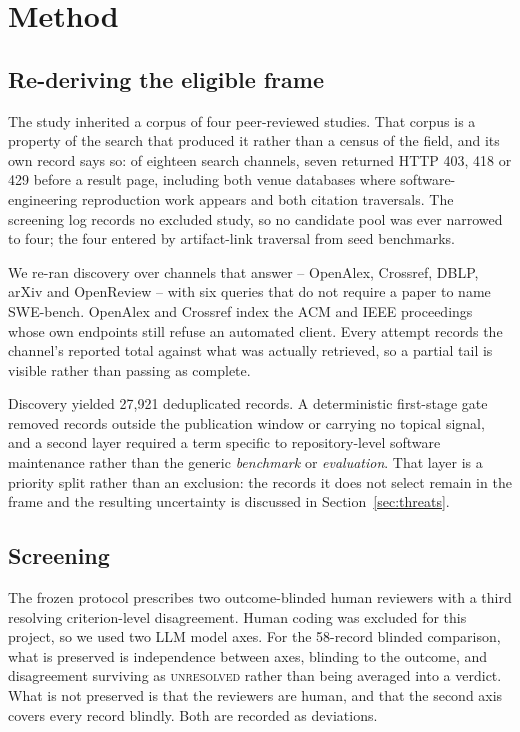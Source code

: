 \section{Method}
\label{sec:method}

\subsection{Re-deriving the eligible frame}
\label{sec:method:frame}

The study inherited a corpus of four peer-reviewed studies. That corpus is a property of the
search that produced it rather than a census of the field, and its own record says so: of
eighteen search channels, seven returned HTTP 403, 418 or 429 before a result page,
including both venue databases where software-engineering reproduction work appears and both
citation traversals. The screening log records no excluded study, so no candidate pool was
ever narrowed to four; the four entered by artifact-link traversal from seed benchmarks.

We re-ran discovery over channels that answer -- OpenAlex, Crossref, DBLP, arXiv and
OpenReview -- with six queries that do not require a paper to name SWE-bench. OpenAlex and
Crossref index the ACM and IEEE proceedings whose own endpoints still refuse an automated
client. Every attempt records the channel's reported total against what was actually
retrieved, so a partial tail is visible rather than passing as complete.

Discovery yielded 27{,}921 deduplicated records. A deterministic first-stage gate removed
records outside the publication window or carrying no topical signal, and a second layer
required a term specific to repository-level software maintenance rather than the generic
\emph{benchmark} or \emph{evaluation}. That layer is a priority split rather than an
exclusion: the records it does not select remain in the frame and the resulting uncertainty
is discussed in Section~\ref{sec:threats}.

\subsection{Screening}
\label{sec:method:screening}

The frozen protocol prescribes two outcome-blinded human reviewers with a third resolving
criterion-level disagreement. Human coding was excluded for this project, so we used two LLM
model axes. For the 58-record blinded comparison, what is preserved is independence
between axes, blinding to the outcome, and disagreement surviving as \textsc{unresolved}
rather than being averaged into a verdict. What is not preserved is that the reviewers are
human, and that the second axis covers every record blindly. Both are recorded as deviations.

